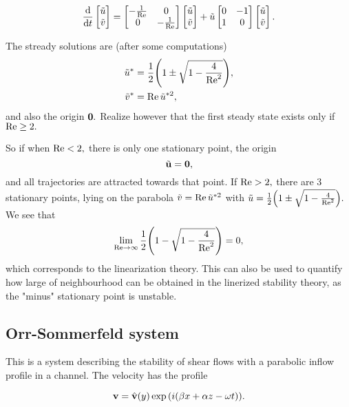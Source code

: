 \documentclass[reqno, a4paper]{article}
\begin{document}
\[
	\dv{t} \begin{bmatrix}
		\tilde{u} \\
		\tilde{v}
	\end{bmatrix}
	= \begin{bmatrix}
		- \frac{1}{\mathrm{Re}} & 0 \\
		0 & - \frac{1}{\mathrm{Re}}
	\end{bmatrix}
	\begin{bmatrix}
		\tilde{u} \\
		\tilde{v}
	\end{bmatrix}
	+ \tilde{u} \begin{bmatrix}
		0 & -1 \\
		1 & 0
	\end{bmatrix}
	\begin{bmatrix}
		\tilde{u} \\
		\tilde{v}
	\end{bmatrix}.
\]

The stready solutions are (after some computations)
\begin{align*}
	\tilde{u}^* &= \frac{1}{2}\qty(1 \pm \sqrt{1-\frac{4}{\mathrm{Re}^{2}}}), \\
	\tilde{v}^{*} &= \mathrm{Re} \, \tilde{u}^{*2},
\end{align*}
and also the origin $\vb{0}.$ Realize however that the first steady state exists only if $\mathrm{Re} \geq 2.$

So if when $\mathrm{Re} < 2, $ there is only one stationary point, the origin
\[
	\tilde{\vb{u}} = \vb{0},
\]
and all trajectories are attracted towards that point. If $\mathrm{Re} > 2,$ there are 3 stationary points, lying on the parabola $\tilde{v} = \mathrm{Re} \, \tilde{u}^{*2}$ with $\tilde{u} = \frac{1}{2}\qty(1 \pm \sqrt{1-\frac{4}{\mathrm{Re}^{2}}}).$ We see that 
\[
	\lim_{\mathrm{Re} \to \infty}\frac{1}{2}\qty(1 - \sqrt{1-\frac{4}{\mathrm{Re}^{2}}}) = 0,
\]
which corresponds to the linearization theory. This can also be used to quantify how large of neighbourhood can be obtained in the linerized stability theory, as the "minus" stationary point is unstable.

\subsection{Orr-Sommerfeld system}
\label{sec:orr_sommerfeld}
This is a system describing the stability of shear flows with a parabolic inflow profile in a channel. The velocity has the profile

\[
	\vb{v} = \hat{\vb{v}}(y)\exp\qty(i \qty(\beta x + \alpha z - \omega t)).
\]
\end{document}
